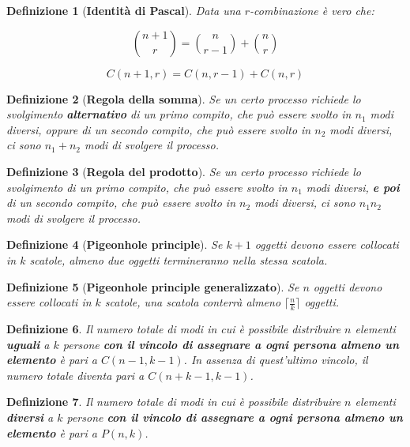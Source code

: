 \documentclass[10pt,a4paper,titlepage]{article}
\theoremstyle{break}
\newtheorem{myDef}{Definizione}
\theoremstyle{break}
\theoremstyle{break}
\begin{document}
\begin{myDef}[\textbf{Identità di Pascal}]

Data una $r$-combinazione è vero che:

\begin{equation}
\binom{n+1}{r} = \binom{n}{r-1} + \binom{n}{r}
\end{equation}

\begin{equation}
C(n+1, r) = C(n, r-1) + C(n,r)
\end{equation}

\end{myDef}


\begin{myDef}[\textbf{Regola della somma}]
Se un certo processo richiede lo svolgimento \textbf{alternativo} di un primo compito, che può essere svolto in $n_1$ modi diversi, oppure di un secondo compito, che può essere svolto in $n_2$ modi diversi, ci sono $n_1 + n_2$ modi di svolgere il processo.
\end{myDef}

\begin{myDef}[\textbf{Regola del prodotto}]
Se un certo processo richiede lo svolgimento di un primo compito, che può essere svolto in $n_1$ modi diversi, \textbf{e poi} di un secondo compito, che può essere svolto in $n_2$ modi diversi, ci sono $n_1  n_2$ modi di svolgere il processo.
\end{myDef}

\begin{myDef}[\textbf{Pigeonhole principle}]
Se $k + 1$ oggetti devono essere collocati in $k$ scatole, almeno due oggetti termineranno nella stessa scatola. 
\end{myDef}

\begin{myDef}[\textbf{Pigeonhole principle generalizzato}]
Se $n$ oggetti devono essere collocati in $k$ scatole, una scatola conterrà almeno $\lceil \frac{n}{k} \rceil$ oggetti.
\end{myDef}

\begin{myDef}
Il numero totale di modi in cui è possibile distribuire $n$ elementi \textbf{uguali} a $k$ persone \textbf{con il vincolo di assegnare a ogni persona almeno un elemento} è pari a $C(n-1, k-1)$. In assenza di quest'ultimo vincolo, il numero totale diventa pari a $C(n+k-1, k-1)$.
\end{myDef}

\begin{myDef}
Il numero totale di modi in cui è possibile distribuire $n$ elementi \textbf{diversi} a $k$ persone \textbf{con il vincolo di assegnare a ogni persona almeno un elemento} è pari a $P(n, k)$.
\end{myDef}
\end{document}
